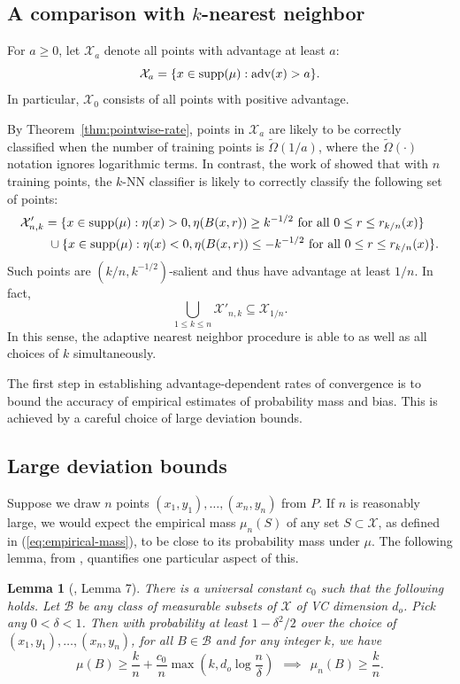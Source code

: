 \documentclass{article}
\def\X{{\mathcal X}}
\def\B{{\mathcal B}}
\def\supp{{\rm supp}}
\def\adv{{\rm adv}}
\newtheorem{lemma}[theorem]{Lemma}
\begin{document}
\subsection{A comparison with $k$-nearest neighbor}

For $a \geq 0$, let $\X_a$ denote all points with advantage at least $a$:
\begin{equation}
\X_a = \{x \in \supp(\mu): \adv(x) > a \} .
\label{eq:advantage-set}
\end{equation}
In particular, $\X_0$ consists of all points with positive advantage. 

By Theorem~\ref{thm:pointwise-rate}, points in $\X_a$ are likely to be correctly classified when the number of training points is $\widetilde{\Omega}(1/a)$, where the $\widetilde{\Omega}(\cdot)$ notation ignores logarithmic terms.
In contrast, the work of \cite{ChaudhuriDasgupta2014} showed that with $n$ training points, the $k$-NN classifier is likely to correctly classify the following set of points:
\begin{align*}
\X'_{n,k} &= \{x \in \supp(\mu): \eta(x) > 0, \eta(B(x,r)) \geq k^{-1/2} \mbox{\ for all $0 \leq r \leq r_{k/n}(x)$}\} \\
&\ \cup \{x \in \supp(\mu): \eta(x) < 0, \eta(B(x,r)) \leq -k^{-1/2} \mbox{\ for all $0 \leq r \leq r_{k/n}(x)$}\} .
\end{align*}
Such points are $(k/n, k^{-1/2})$-salient and thus have advantage at least $1/n$. In fact,
$$ \bigcup_{1 \leq k \leq n} \X'_{n,k} \subseteq \X_{1/n} .$$
In this sense, the adaptive nearest neighbor procedure is able to as well as all choices of $k$ simultaneously.

The first step in establishing advantage-dependent rates of convergence is to bound the accuracy of empirical estimates of probability mass and bias. This is achieved by a careful choice of large deviation bounds.

\subsection{Large deviation bounds}

Suppose we draw $n$ points $(x_1, y_1), \ldots, (x_n, y_n)$ from $P$. If $n$ is reasonably large, we would expect the empirical mass $\mu_n(S)$ of any set $S \subset \X$, as defined in (\ref{eq:empirical-mass}), to be close to its probability mass under $\mu$. The following lemma, from \cite{ChaudhuriDasgupta2010}, quantifies one particular aspect of this.
\begin{lemma}[\cite{ChaudhuriDasgupta2010}, Lemma 7]
There is a universal constant $c_0$ such that the following holds. Let $\B$ be any class of measurable subsets of $\X$ of VC dimension $d_o$. Pick any $0 < \delta < 1$. Then with probability at least $1-\delta^2/2$ over the choice of $(x_1, y_1), \ldots, (x_n, y_n)$, for all $B \in \B$ and for any integer $k$, we have
$$ \mu(B) \geq \frac{k}{n} + \frac{c_0}{n} \max \left( k, d_o \log \frac{n}{\delta} \right)
\ \ \implies \ \ 
\mu_{n}(B) \geq \frac{k}{n} .$$
\label{lemma:points-in-balls}
\end{lemma}
\end{document}
